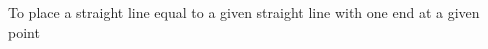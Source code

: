 \documentclass[preview]{standalone}
\begin{document}
\begin{center}
To place a straight line equal to a given straight line with one end 
 at a given point
\end{center}
\end{document}
